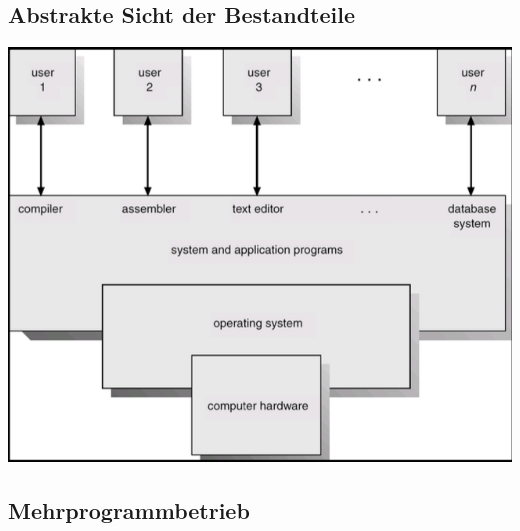 \documentclass[11pt]{article}
\begin{document}
\subsection*{Abstrakte Sicht der Bestandteile}
\label{sec:org77347f8}
\begin{center}
\includegraphics[width=.9\linewidth]{./Abbildungen/computersystem.png}
\end{center}
\subsection*{Mehrprogrammbetrieb}
\label{sec:orgd3d6f4b}
\end{document}
